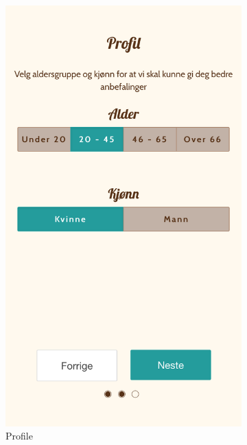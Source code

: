 \begin{appendices}
\begin{figure}
\begin{subfigure}[h]{0.3\textwidth}
			\includegraphics[width=\textwidth]{fig/screenshot_profile}
			\caption{Profile}
		\end{subfigure}
		\begin{subfigure}[h]{0.3\textwidth}

\end{subfigure}
\end{figure}
\end{appendices}
